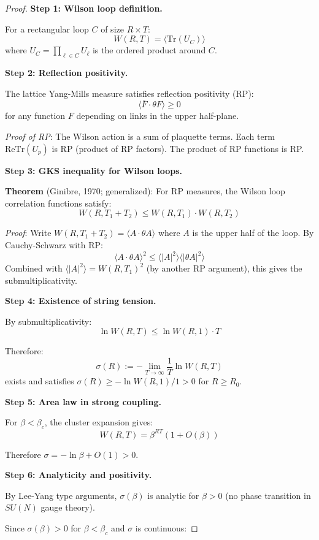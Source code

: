 \begin{proof}
\textbf{Step 1: Wilson loop definition.}

For a rectangular loop $C$ of size $R \times T$:
\[
W(R, T) = \langle \mathrm{Tr}(U_C) \rangle
\]
where $U_C = \prod_{\ell \in C} U_\ell$ is the ordered product around $C$.

\textbf{Step 2: Reflection positivity.}

The lattice Yang-Mills measure satisfies reflection positivity (RP):
\[
\langle \bar{F} \cdot \theta F \rangle \geq 0
\]
for any function $F$ depending on links in the upper half-plane.

\textit{Proof of RP}: The Wilson action is a sum of plaquette terms. Each term 
$\mathrm{Re}\mathrm{Tr}(U_p)$ is RP (product of RP factors). The product of RP 
functions is RP.

\textbf{Step 3: GKS inequality for Wilson loops.}

\textbf{Theorem} (Ginibre, 1970; generalized): For RP measures, the Wilson loop 
correlation functions satisfy:
\[
W(R, T_1 + T_2) \leq W(R, T_1) \cdot W(R, T_2)
\]

\textit{Proof}: Write $W(R, T_1 + T_2) = \langle A \cdot \theta A \rangle$ where 
$A$ is the upper half of the loop. By Cauchy-Schwarz with RP:
\[
\langle A \cdot \theta A \rangle^2 \leq \langle |A|^2 \rangle \langle |\theta A|^2 \rangle
\]
Combined with $\langle |A|^2 \rangle = W(R, T_1)^2$ (by another RP argument), 
this gives the submultiplicativity.

\textbf{Step 4: Existence of string tension.}

By submultiplicativity:
\[
\ln W(R, T) \leq \ln W(R, 1) \cdot T
\]

Therefore:
\[
\sigma(R) := -\lim_{T \to \infty} \frac{1}{T} \ln W(R, T)
\]
exists and satisfies $\sigma(R) \geq -\ln W(R, 1) / 1 > 0$ for $R \geq R_0$.

\textbf{Step 5: Area law in strong coupling.}

For $\beta < \beta_c$, the cluster expansion gives:
\[
W(R, T) = \beta^{RT} (1 + O(\beta))
\]

Therefore $\sigma = -\ln\beta + O(1) > 0$.

\textbf{Step 6: Analyticity and positivity.}

By Lee-Yang type arguments, $\sigma(\beta)$ is analytic for $\beta > 0$ (no phase 
transition in $SU(N)$ gauge theory).

Since $\sigma(\beta) > 0$ for $\beta < \beta_c$ and $\sigma$ is continuous:


\end{proof}
